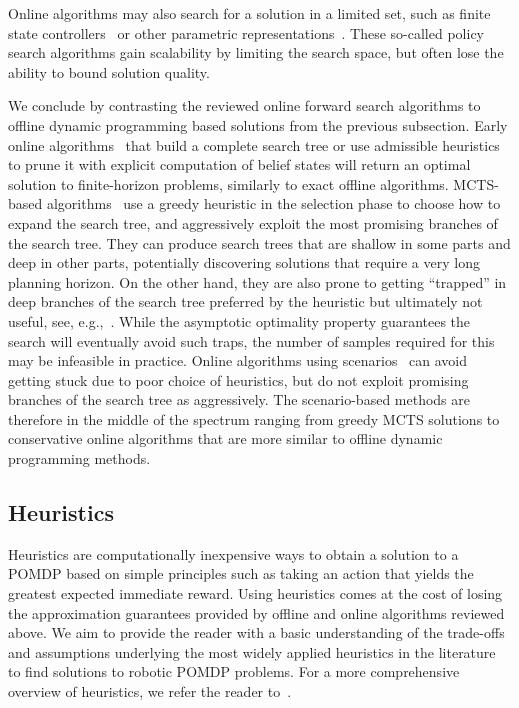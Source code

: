 \documentclass[journal]{IEEEtran}
\begin{document}
Online algorithms may also search for a solution in a limited set, such as finite state controllers~\cite{bai2010monte,bai2014integrated,pajarinen2017robotic} or other parametric representations~\cite{martinez2009bayesian,buffet2009factored}.
These {so-called policy search algorithms gain scalability by limiting the search space, but often lose the ability to bound solution quality.}

We conclude by contrasting the reviewed online forward search algorithms to offline dynamic programming based solutions from the previous subsection.
Early online algorithms~\cite{ross2008online} that build a complete search tree or use admissible heuristics to prune it with explicit computation of belief states will return an optimal solution to finite-horizon problems, {similarly to} exact offline algorithms.
MCTS-based algorithms~\cite{silver2010monte,sunberg2018online} use a greedy heuristic in the selection phase to choose how to expand the search tree, and aggressively exploit {the} most promising branches of the search tree.
They can produce search trees that are shallow in some parts and deep in other parts,  potentially discovering solutions that require a very long planning horizon.
On the other hand, they are also prone to getting ``trapped'' in deep branches of the search tree preferred by the heuristic but ultimately not useful, see, e.g.,~\cite[Sect.~2.3.]{Munos14}.
While the asymptotic optimality property guarantees the search will eventually avoid such traps, the number of samples required for this may be infeasible in practice.
Online algorithms using scenarios~\cite{somani2013despot} can avoid getting stuck due to poor choice of heuristics, but do not exploit promising branches of the search tree as aggressively.
The scenario-based methods {are therefore in the middle} of the spectrum ranging from greedy MCTS solutions to conservative online algorithms {that are} more similar to offline dynamic programming methods.

\subsection{Heuristics}
\label{subsec:bounds_heuristics}
Heuristics are computationally inexpensive ways to obtain a solution to a POMDP based on simple principles such as taking an action that yields the greatest expected immediate reward.
Using heuristics comes at the cost of losing the approximation
guarantees provided by offline and online algorithms reviewed above.
We aim to provide the reader with a basic understanding of the trade-offs and assumptions underlying the most widely applied heuristics in the literature to find solutions to robotic POMDP problems.
For a more comprehensive overview of heuristics, we refer the reader
to~\cite{hauskrecht2000value,bertsekas2005dynamic}.
\end{document}
